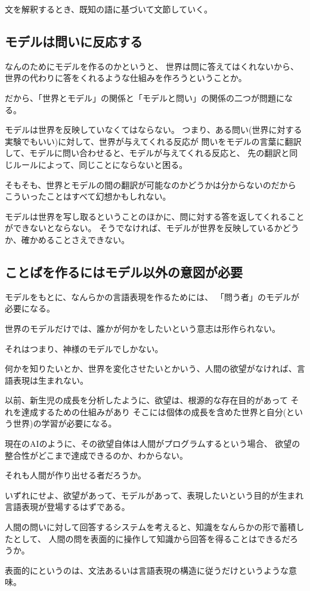 \documentclass[10pt, oneside]{jarticle}   	%
\begin{document}
文を解釈するとき、既知の語に基づいて文節していく。



\subsection{モデルは問いに反応する}
なんのためにモデルを作るのかというと、
世界は問に答えてはくれないから、
世界の代わりに答をくれるような仕組みを作ろうということか。

だから、「世界とモデル」の関係と「モデルと問い」の関係の二つが問題になる。

モデルは世界を反映していなくてはならない。
つまり、ある問い(世界に対する実験でもいい)に対して、世界が与えてくれる反応が
問いをモデルの言葉に翻訳して、モデルに問い合わせると、モデルが与えてくれる反応と、
先の翻訳と同じルールによって、同じことにならないと困る。

そもそも、世界とモデルの間の翻訳が可能なのかどうかは分からないのだから
こういったことはすべて幻想かもしれない。

モデルは世界を写し取るということのほかに、問に対する答を返してくれることができないとならない。
そうでなければ、モデルが世界を反映しているかどうか、確かめることさえできない。

\subsection{ことばを作るにはモデル以外の意図が必要}
モデルをもとに、なんらかの言語表現を作るためには、
「問う者」のモデルが必要になる。

世界のモデルだけでは、誰かが何かをしたいという意志は形作られない。

それはつまり、神様のモデルでしかない。

何かを知りたいとか、世界を変化させたいとかいう、人間の欲望がなければ、言語表現は生まれない。

以前、新生児の成長を分析したように、欲望は、根源的な存在目的があって
それを達成するための仕組みがあり
そこには個体の成長を含めた世界と自分(という世界)の学習が必要になる。

現在のAIのように、その欲望自体は人間がプログラムするという場合、
欲望の整合性がどこまで達成できるのか、わからない。

それも人間が作り出せる者だろうか。

いずれにせよ、欲望があって、モデルがあって、表現したいという目的が生まれ
言語表現が登場するはずである。


人間の問いに対して回答するシステムを考えると、知識をなんらかの形で蓄積したとして、
人間の問を表面的に操作して知識から回答を得ることはできるだろうか。

表面的にというのは、文法あるいは言語表現の構造に従うだけというような意味。
\end{document}

